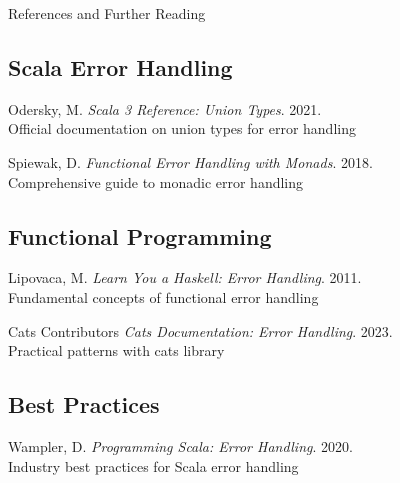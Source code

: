 \documentclass{beamer}
\begin{document}
\begin{frame}{References and Further Reading}
\footnotesize

\begin{thebibliography}{9}
\beamertemplatetextbibitems

\subsection*{Scala Error Handling}
\textcolor{pureblue}{Odersky, M.} 
\textit{Scala 3 Reference: Union Types}. 2021.
\footnotesize{\\ \color{gray}Official documentation on union types for error handling}

\textcolor{pureblue}{Spiewak, D.} 
\textit{Functional Error Handling with Monads}. 2018.
\footnotesize{\\ \color{gray}Comprehensive guide to monadic error handling}

\subsection*{Functional Programming}
\textcolor{pureblue}{Lipovaca, M.} 
\textit{Learn You a Haskell: Error Handling}. 2011.
\footnotesize{\\ \color{gray}Fundamental concepts of functional error handling}

\textcolor{pureblue}{Cats Contributors} 
\textit{Cats Documentation: Error Handling}. 2023.
\footnotesize{\\ \color{gray}Practical patterns with cats library}

\subsection*{Best Practices}
\textcolor{pureblue}{Wampler, D.} 
\textit{Programming Scala: Error Handling}. 2020.
\footnotesize{\\ \color{gray}Industry best practices for Scala error handling}

\end{thebibliography}

\end{frame}
\end{document}
